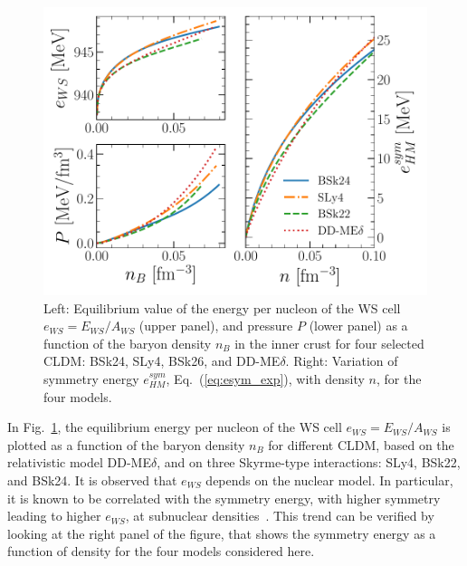 \begin{figure}[!t]
\begin{center}
  \includegraphics[width=0.9\linewidth]{figures/eos_icrust.pdf}
\end{center}
\caption[Energy per nucleon and pressure versus baryon density in the inner
crust, and symmetry energy at subsaturation densities]{Left: Equilibrium value 
  of the energy per nucleon of the WS cell $e_{WS} =
  E_{WS}/A_{WS}$ (upper panel), and pressure $P$ (lower panel) as a function of 
  the baryon 
density $n_B$ in the inner crust for four selected CLDM: BSk24, SLy4, BSk26,
and DD-ME$\delta$. Right: Variation of symmetry energy $e_{HM}^{sym}$,
Eq.~(\ref{eq:esym_exp}), with density $n$, for the four models.}\label{fig:eos_icrust}
\end{figure}

In Fig.~\ref{fig:eos_icrust}, the equilibrium energy
per nucleon of the WS cell $e_{WS} = E_{WS}/A_{WS}$ is plotted as a function of
the baryon density $n_B$ for different CLDM, based on the relativistic 
model DD-ME$\delta$, and on three Skyrme-type interactions: SLy4, BSk22, and
BSk24. It is observed that $e_{WS}$ depends on the nuclear model. In
particular, it is known to be correlated with the symmetry
energy, with higher symmetry leading to higher $e_{WS}$, at subnuclear
densities~\cite{Pearson2018}. This trend can be verified by looking at the
right panel of the figure, that shows the symmetry energy as a function of
density for the four models considered here.

